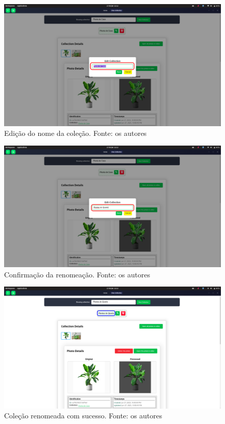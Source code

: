 \begin{figure}[H]
    \centering
    \includegraphics[width=1\textwidth]{../figures/screens/uc008/Screenshot from 2025-06-27 22-12-53.png}
    \caption{Edição do nome da coleção. Fonte: os autores}
    \label{fig:uc008-screen3}
\end{figure}

\begin{figure}[H]
    \centering
    \includegraphics[width=1\textwidth]{../figures/screens/uc008/Screenshot from 2025-06-27 22-13-02.png}
    \caption{Confirmação da renomeação. Fonte: os autores}
    \label{fig:uc008-screen4}
\end{figure}

\begin{figure}[H]
    \centering
    \includegraphics[width=1\textwidth]{../figures/screens/uc008/Screenshot from 2025-06-27 22-13-11.png}
    \caption{Coleção renomeada com sucesso. Fonte: os autores}
    \label{fig:uc008-screen5}
\end{figure}

